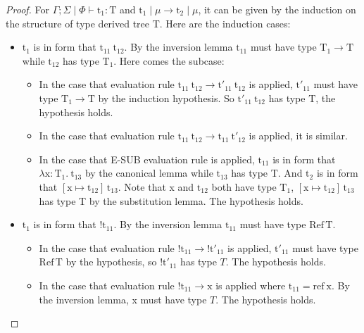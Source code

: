 \documentclass[10pt]{article}
\newcommand{\lto}{\longrightarrow}
\newcommand{\context}{\Gamma;\Sigma\mid\Phi}
\theoremstyle{definition}\newtheorem*{theorem}{Theorem}
\theoremstyle{definition}\newtheorem*{definition}{Definition}
\begin{document}
    \begin{proof}
        For $\context\vdash\mathrm{t_1}\colon\mathrm{T}$ and $\mathrm{t_1}\mid\mu\lto\mathrm{t_2}\mid\mu$, it can be given by the induction on the structure of type derived tree T. Here are the induction cases:
        \begin{itemize}
            \item $\mathrm{t_1}$ is in form that $\mathrm{t_{11}}\ \mathrm{t_{12}}$. By the inversion lemma $\mathrm{t_{11}}$ must have type $\mathrm{T_1}\to\mathrm{T}$ while $\mathrm{t_{12}}$ has type $\mathrm{T_1}$.
                Here comes the subcase:
                \begin{itemize}
                    \item In the case that evaluation rule $\mathrm{t_{11}}\ \mathrm{t_{12}} \lto \mathrm{t'_{11}}\ \mathrm{t_{12}}$ is applied, $\mathrm{t'_{11}}$ must have type $\mathrm{T_1}\to\mathrm{T}$ by the induction hypothesis. So $\mathrm{t'_{11}}\ \mathrm{t_{12}}$ has type $\mathrm{T}$, the hypothesis holds.
                    \item In the case that evaluation rule $\mathrm{t_{11}}\ \mathrm{t_{12}} \lto \mathrm{t_{11}}\ \mathrm{t'_{12}}$ is applied, it is similar.
                    \item In the case that E-SUB evaluation rule is applied, $\mathrm{t_{11}}$ is in form that $\lambda \mathrm{x}\colon \mathrm{T_1}.\ \mathrm{t_{13}}$ by the canonical lemma while $\mathrm{t_{13}}$ has type T.
                        And $\mathrm{t_2}$ is in form that $[\mathrm{x}\mapsto\mathrm{t_{12}}]\, \mathrm{t_{13}}$. Note that x and $\mathrm{t_{12}}$ both have type $\mathrm{T_1}$, $[\mathrm{x}\mapsto\mathrm{t_{12}}]\, \mathrm{t_{13}}$ has type T by the substitution lemma. The hypothesis holds.
                \end{itemize}
                \item $\mathrm{t_1}$ is in form that $!\mathrm{t_{11}}$. By the inversion lemma $\mathrm{t_{11}}$ must have type $\mathrm{Ref}\,\mathrm{T}$.
                    \begin{itemize}
                        \item In the case that evaluation rule $!\mathrm{t_{11}}\lto!\mathrm{t'_{11}}$ is applied, $\mathrm{t'_{11}}$ must have type $\mathrm{Ref}\,\mathrm{T}$ by the hypothesis,
                            so $!\mathrm{t'_{11}}$ has type $T$. The hypothesis holds.
                        \item In the case that evaluation rule $!\mathrm{t_{11}}\lto \mathrm{x}$ is applied where $\mathrm{t_{11}} = \mathrm{ref}\ \mathrm{x}$. By the inversion lemma, x must have type $T$. The hypothesis holds.

\end{itemize}
\end{itemize}
\end{proof}
\end{document}

